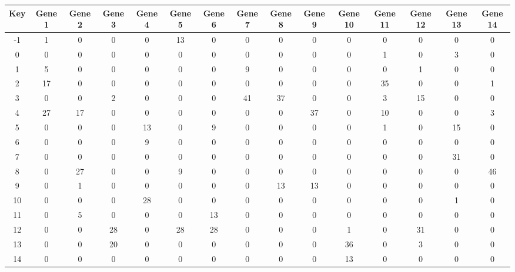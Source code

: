 \begin{tabular}{|c|c|c|c|c|c|c|c|c|c|c|c|c|c|c|}
\hline
Key & Gene 1 & Gene 2 & Gene 3 & Gene 4 & Gene 5 & Gene 6 & Gene 7 & Gene 8 & Gene 9 & Gene 10 & Gene 11 & Gene 12 & Gene 13 & Gene 14 \\
\hline
-1 & 1 & 0 & 0 & 0 & 13 & 0 & 0 & 0 & 0 & 0 & 0 & 0 & 0 & 0 \\
0 & 0 & 0 & 0 & 0 & 0 & 0 & 0 & 0 & 0 & 0 & 1 & 0 & 3 & 0 \\
1 & 5 & 0 & 0 & 0 & 0 & 0 & 9 & 0 & 0 & 0 & 0 & 1 & 0 & 0 \\
2 & 17 & 0 & 0 & 0 & 0 & 0 & 0 & 0 & 0 & 0 & 35 & 0 & 0 & 1 \\
3 & 0 & 0 & 2 & 0 & 0 & 0 & 41 & 37 & 0 & 0 & 3 & 15 & 0 & 0 \\
4 & 27 & 17 & 0 & 0 & 0 & 0 & 0 & 0 & 37 & 0 & 10 & 0 & 0 & 3 \\
5 & 0 & 0 & 0 & 13 & 0 & 9 & 0 & 0 & 0 & 0 & 1 & 0 & 15 & 0 \\
6 & 0 & 0 & 0 & 9 & 0 & 0 & 0 & 0 & 0 & 0 & 0 & 0 & 0 & 0 \\
7 & 0 & 0 & 0 & 0 & 0 & 0 & 0 & 0 & 0 & 0 & 0 & 0 & 31 & 0 \\
8 & 0 & 27 & 0 & 0 & 9 & 0 & 0 & 0 & 0 & 0 & 0 & 0 & 0 & 46 \\
9 & 0 & 1 & 0 & 0 & 0 & 0 & 0 & 13 & 13 & 0 & 0 & 0 & 0 & 0 \\
10 & 0 & 0 & 0 & 28 & 0 & 0 & 0 & 0 & 0 & 0 & 0 & 0 & 1 & 0 \\
11 & 0 & 5 & 0 & 0 & 0 & 13 & 0 & 0 & 0 & 0 & 0 & 0 & 0 & 0 \\
12 & 0 & 0 & 28 & 0 & 28 & 28 & 0 & 0 & 0 & 1 & 0 & 31 & 0 & 0 \\
13 & 0 & 0 & 20 & 0 & 0 & 0 & 0 & 0 & 0 & 36 & 0 & 3 & 0 & 0 \\
14 & 0 & 0 & 0 & 0 & 0 & 0 & 0 & 0 & 0 & 13 & 0 & 0 & 0 & 0 \\
\hline
\end{tabular}